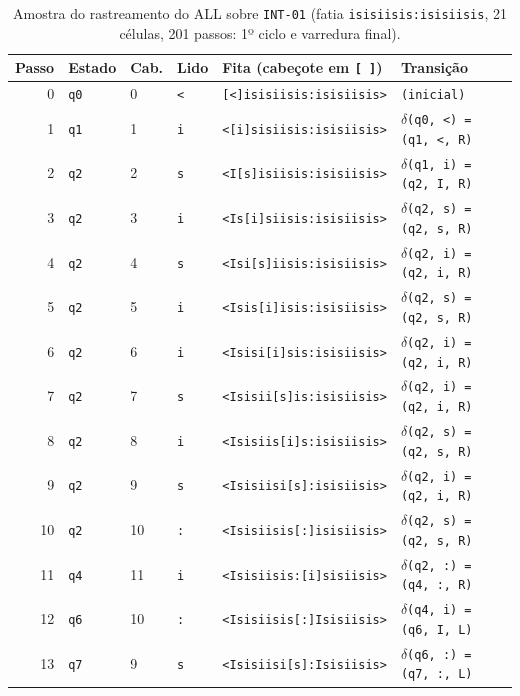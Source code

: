 \begin{table}[t]
\centering
\caption{Amostra do rastreamento do ALL sobre \texttt{INT-01} (fatia \texttt{isisiisis:isisiisis}, 21 células, 201 passos: 1º ciclo e varredura final).}
\label{tab:trace_all_int1}
\scriptsize\setlength{\tabcolsep}{4pt}
\begin{tabularx}{\textwidth}{@{}rllllX@{}}
\toprule
Passo & Estado & Cab. & Lido & Fita (cabeçote em \texttt{[ ]}) & Transição \\
\midrule
0 & \texttt{q0} & 0 & \texttt{<} & \texttt{[<]isisiisis:isisiisis>} & \texttt{(inicial)} \\
1 & \texttt{q1} & 1 & \texttt{i} & \texttt{<[i]sisiisis:isisiisis>} & \texttt{$\delta$(q0, <) = (q1, <, R)} \\
2 & \texttt{q2} & 2 & \texttt{s} & \texttt{<I[s]isiisis:isisiisis>} & \texttt{$\delta$(q1, i) = (q2, I, R)} \\
3 & \texttt{q2} & 3 & \texttt{i} & \texttt{<Is[i]siisis:isisiisis>} & \texttt{$\delta$(q2, s) = (q2, s, R)} \\
4 & \texttt{q2} & 4 & \texttt{s} & \texttt{<Isi[s]iisis:isisiisis>} & \texttt{$\delta$(q2, i) = (q2, i, R)} \\
5 & \texttt{q2} & 5 & \texttt{i} & \texttt{<Isis[i]isis:isisiisis>} & \texttt{$\delta$(q2, s) = (q2, s, R)} \\
6 & \texttt{q2} & 6 & \texttt{i} & \texttt{<Isisi[i]sis:isisiisis>} & \texttt{$\delta$(q2, i) = (q2, i, R)} \\
7 & \texttt{q2} & 7 & \texttt{s} & \texttt{<Isisii[s]is:isisiisis>} & \texttt{$\delta$(q2, i) = (q2, i, R)} \\
8 & \texttt{q2} & 8 & \texttt{i} & \texttt{<Isisiis[i]s:isisiisis>} & \texttt{$\delta$(q2, s) = (q2, s, R)} \\
9 & \texttt{q2} & 9 & \texttt{s} & \texttt{<Isisiisi[s]:isisiisis>} & \texttt{$\delta$(q2, i) = (q2, i, R)} \\
10 & \texttt{q2} & 10 & \texttt{:} & \texttt{<Isisiisis[:]isisiisis>} & \texttt{$\delta$(q2, s) = (q2, s, R)} \\
11 & \texttt{q4} & 11 & \texttt{i} & \texttt{<Isisiisis:[i]sisiisis>} & \texttt{$\delta$(q2, :) = (q4, :, R)} \\
12 & \texttt{q6} & 10 & \texttt{:} & \texttt{<Isisiisis[:]Isisiisis>} & \texttt{$\delta$(q4, i) = (q6, I, L)} \\
13 & \texttt{q7} & 9 & \texttt{s} & \texttt{<Isisiisi[s]:Isisiisis>} & \texttt{$\delta$(q6, :) = (q7, :, L)} \\

\end{tabularx}
\end{table}
